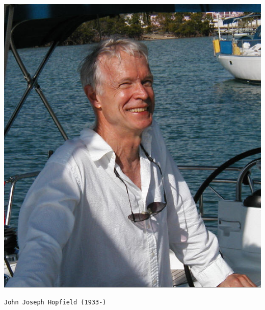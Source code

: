 \documentclass[12pt]{article}
\numberwithin{equation}{section}
\begin{document}
\begin{minipage}[c]{0.45\textwidth}
    \includegraphics[width=\textwidth]{./images/JJHopfield.png}
    \begin{center}
        {\texttt{John Joseph Hopfield (1933-)}}
    \end{center}
\end{minipage}

\newpage
\end{document}
